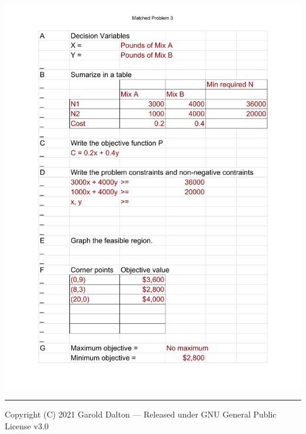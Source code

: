 \documentclass[14pt]{extarticle}
\begin{document}
\begin{center}
	\includegraphics[width=0.9\linewidth]{Math208 Sec5-3 - Sheet3.pdf}
\end{center}


\noindent\rule{\textwidth}{1pt}
{\footnotesize Copyright (C) 2021 Garold Dalton --- Released under GNU General Public License v3.0}


\cleardoublepage
\end{document}
